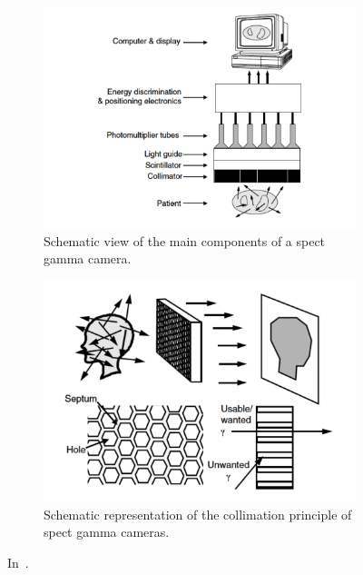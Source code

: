  \begin{figure}[!htbp]
\begin{subfigure}[t]{.49\textwidth}
\centering
\includegraphics[width=0.7\linewidth]{03_GraphicFiles/chapter1_Introduction/SPECT_components.pdf}
\caption{Schematic view of the main components of a \gls{spect} gamma camera.}
\label{chap1::fig::SPECT_components}
\end{subfigure}
\begin{subfigure}[t]{.49\textwidth}
\centering
\includegraphics[width=0.98\linewidth]{03_GraphicFiles/chapter1_Introduction/SPECT_collimator.pdf}
\caption{Schematic representation of the collimation principle of \gls{spect} gamma cameras.}
\label{chap1::fig::SPECT_collimator}
\end{subfigure}
\caption{In~\cite{Zeng2004}.}
\label{chap1::fig::SPECT_details}
\end{figure} 

